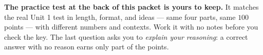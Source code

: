 \vspace{0.12in}

\begin{remindbox}
\small
\textbf{The practice test at the back of this packet is yours to keep.} It
matches the real Unit 1 test in length, format, and ideas --- same four parts,
same $100$ points --- with different numbers and contexts. Work it with no
notes before you check the key. The last question asks you to \emph{explain your
reasoning}: a correct answer with no reason earns only part of the points.
\end{remindbox}
